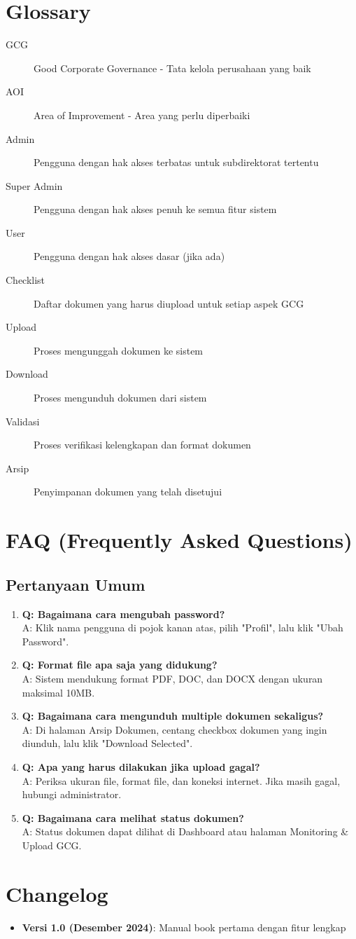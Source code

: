 \documentclass[12pt,a4paper]{article}
\begin{document}
\section{Glossary}
\begin{description}
\item[GCG] Good Corporate Governance - Tata kelola perusahaan yang baik
\item[AOI] Area of Improvement - Area yang perlu diperbaiki
\item[Admin] Pengguna dengan hak akses terbatas untuk subdirektorat tertentu
\item[Super Admin] Pengguna dengan hak akses penuh ke semua fitur sistem
\item[User] Pengguna dengan hak akses dasar (jika ada)
\item[Checklist] Daftar dokumen yang harus diupload untuk setiap aspek GCG
\item[Upload] Proses mengunggah dokumen ke sistem
\item[Download] Proses mengunduh dokumen dari sistem
\item[Validasi] Proses verifikasi kelengkapan dan format dokumen
\item[Arsip] Penyimpanan dokumen yang telah disetujui
\end{description}

\section{FAQ (Frequently Asked Questions)}

\subsection{Pertanyaan Umum}
\begin{enumerate}
\item \textbf{Q: Bagaimana cara mengubah password?}\\
A: Klik nama pengguna di pojok kanan atas, pilih "Profil", lalu klik "Ubah Password".

\item \textbf{Q: Format file apa saja yang didukung?}\\
A: Sistem mendukung format PDF, DOC, dan DOCX dengan ukuran maksimal 10MB.

\item \textbf{Q: Bagaimana cara mengunduh multiple dokumen sekaligus?}\\
A: Di halaman Arsip Dokumen, centang checkbox dokumen yang ingin diunduh, lalu klik "Download Selected".

\item \textbf{Q: Apa yang harus dilakukan jika upload gagal?}\\
A: Periksa ukuran file, format file, dan koneksi internet. Jika masih gagal, hubungi administrator.

\item \textbf{Q: Bagaimana cara melihat status dokumen?}\\
A: Status dokumen dapat dilihat di Dashboard atau halaman Monitoring \& Upload GCG.
\end{enumerate}

\section{Changelog}
\begin{itemize}
\item \textbf{Versi 1.0 (Desember 2024)}: Manual book pertama dengan fitur lengkap
\end{itemize}
\end{document}
